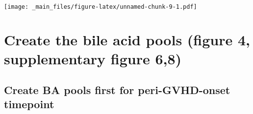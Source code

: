 \documentclass[
]{book}
\begin{document}
\texttt{[image: \_main\_files/figure-latex/unnamed-chunk-9-1.pdf]}

\hypertarget{create-the-bile-acid-pools-figure-4-supplementary-figure-68}{%
\chapter{Create the bile acid pools (figure 4, supplementary figure 6,8)}\label{create-the-bile-acid-pools-figure-4-supplementary-figure-68}}

\hypertarget{create-ba-pools-first-for-peri-gvhd-onset-timepoint}{%
\section{Create BA pools first for peri-GVHD-onset timepoint}\label{create-ba-pools-first-for-peri-gvhd-onset-timepoint}}
\end{document}
